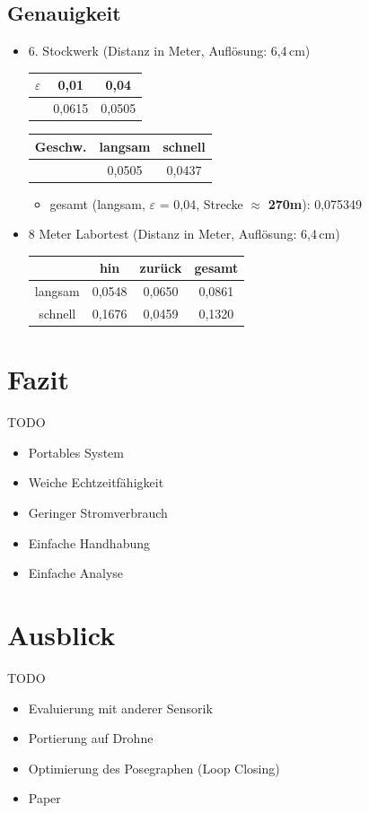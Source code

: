 \documentclass{beamer}
\begin{document}
\subsection{Genauigkeit}
\begin{frame}{\subsecname}
\begin{itemize}
\item{6. Stockwerk (Distanz in Meter, Auflösung: 6,4\,cm)}
\begin{center}
\begin{tabular}{ccc}
\toprule
$\varepsilon$ & 0,01 & 0,04 \\ 
\midrule
& 0,0615 & 0,0505 \\  
\bottomrule
\end{tabular}
\end{center}
\begin{center}
\begin{tabular}{ccc}
\toprule
Geschw. & langsam & schnell \\ 
\midrule
& 0,0505 & 0,0437 \\  
\bottomrule
\end{tabular}
\end{center}
\begin{itemize}
\item{gesamt (langsam, $\varepsilon$ = 0,04, Strecke $\approx$ \textbf{270m}): 0,075349}
\end{itemize}
\item{8 Meter Labortest (Distanz in Meter, Auflösung: 6,4\,cm)}
\begin{center}
\begin{tabular}{cccc}
\toprule
& hin & zurück & gesamt \\ 
\midrule
langsam & 0,0548 & 0,0650 & 0,0861 \\  
schnell & 0,1676 & 0,0459 & 0,1320 \\
\bottomrule
\end{tabular}
\end{center}
\end{itemize}
\end{frame}

\section*{Fazit}
\begin{frame}{\secname}
TODO
\begin{itemize}
\item{Portables System}
\item{Weiche Echtzeitfähigkeit}
\item{Geringer Stromverbrauch}
\item{Einfache Handhabung}
\item{Einfache Analyse}
\end{itemize}   
\end{frame}

\section*{Ausblick}
\begin{frame}{\secname}
TODO
\begin{itemize}
\item Evaluierung mit anderer Sensorik
\item Portierung auf Drohne
\item Optimierung des Posegraphen (Loop Closing)
\item Paper
\end{itemize}
\end{frame}
\end{document}

